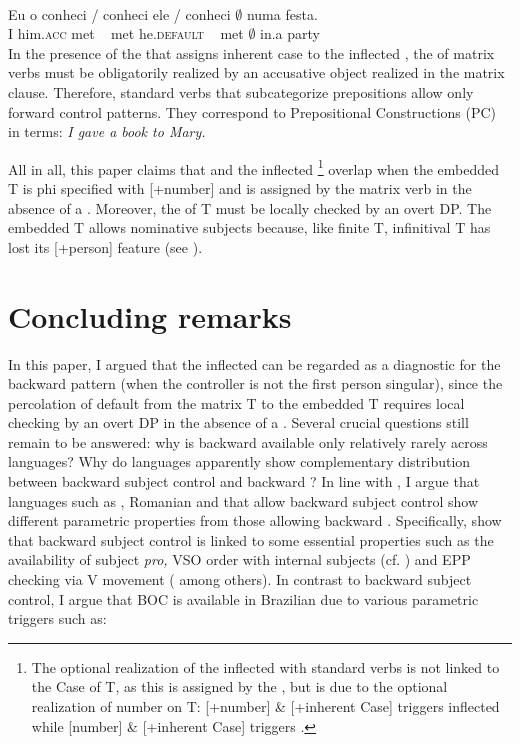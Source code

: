 \documentclass[output=paper]{langsci/langscibook}
\begin{document}
\ea%
    \citep[328]{Farrell1990}\label{ex:moreno:29}\\
    \gll Eu  o       conheci \slash{} conheci ele        \slash{}  conheci {$\emptyset$} numa festa. \\
         I  him.\textsc{acc} met  ~  met  he.\textsc{default} ~ met   {$\emptyset$} in.a    party\\
\z
In the presence of the  that assigns inherent case to the inflected , the  of matrix verbs must be obligatorily realized by an accusative object realized in the matrix clause. Therefore, standard  verbs that subcategorize prepositions allow only forward control patterns. They correspond to Prepositional Constructions (PC) in  terms: \textit{I gave a book to Mary.}

All in all, this paper claims that  and the inflected \footnote{The optional realization of the inflected  with standard  verbs is not linked to the Case of T, as this is assigned by the , but is due to the optional realization of number on T: [+number] \& [+inherent Case]  triggers inflected  while [\textminus number] \& [+inherent Case] triggers  .} overlap when the embedded T is phi specified with [+number] and is assigned  by the matrix verb in the absence of a . Moreover, the  of T must be locally checked by an overt DP. The embedded T allows nominative subjects because, like finite T, infinitival T has lost its [+person] feature (see \citealt{Cyrino2010}).

\section{Concluding remarks}%

In this paper, I argued that the inflected  can be regarded as a diagnostic for the backward  pattern (when the controller is not the first person singular), since the percolation of default  from the matrix T to the embedded T requires local checking by an overt DP in the absence of a . Several crucial questions still remain to be answered: why is backward  available only relatively rarely across languages? Why do languages apparently show complementary distribution between backward subject control and backward ? In line with \citet{Alexiadou2010}, I argue that languages such as , Romanian and  that allow backward subject control show different parametric properties from those allowing backward . Specifically, \citet{Alexiadou2010} show that backward subject control is linked to some essential properties such as the availability of subject \textit{pro,} VSO order with internal subjects (cf. \citealt{Alexiadou2001Functional}) and EPP checking via V movement (\citealt{Alexiadou1998} among others). In contrast to backward subject control, I argue that BOC is available in Brazilian  due to various parametric triggers such as:
\end{document}
